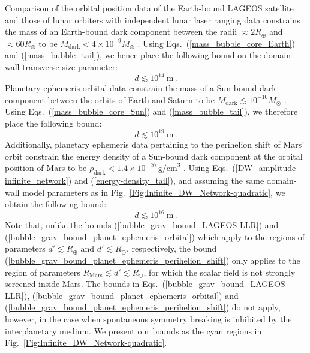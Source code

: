 \documentclass[aps,prd,onecolumn,nofootinbib]{revtex4-2} %
\begin{document}
Comparison of the orbital position data of the Earth-bound LAGEOS satellite and those of lunar orbiters with independent lunar laser ranging data constrains the mass of an Earth-bound dark component between the radii $\approx 2 R_\oplus$ and $\approx 60 R_\oplus$ to be $M_\textrm{dark} < 4 \times 10^{-9} M_\oplus$ \cite{Adler_2008_Grav_LAGEOS-LLR}. 
Using Eqs.~(\ref{mass_bubble_core_Earth}) and (\ref{mass_bubble_tail}), we hence place the following bound on the domain-wall transverse size parameter: 
\begin{equation}
\label{bubble_grav_bound_LAGEOS-LLR}
d \lesssim 10^{14}~\textrm{m}  \, . 
\end{equation}
Planetary ephemeris orbital data constrain the mass of a Sun-bound dark component between the orbits of Earth and Saturn to be $M_\textrm{dark} \lesssim 10^{-10} M_\odot$ \cite{Pitjeva_2013_planetary_ephemeris_MNRAS,Pitjeva_2013_planetary_ephemeris_Astron-Lett}. 
Using Eqs.~(\ref{mass_bubble_core_Sun}) and (\ref{mass_bubble_tail}), we therefore place the following bound: 
\begin{equation}
\label{bubble_grav_bound_planet_ephemeris_orbital}
d \lesssim 10^{19}~\textrm{m}  \, . 
\end{equation}
Additionally, planetary ephemeris data pertaining to the perihelion shift of Mars' orbit constrain the energy density of a Sun-bound dark component at the orbital position of Mars to be $\rho_\textrm{dark} < 1.4 \times 10^{-20}~\textrm{g/cm}^3$ \cite{Pitjeva_2013_planetary_ephemeris_MNRAS,Pitjeva_2013_planetary_ephemeris_Astron-Lett}. 
Using Eqs.~(\ref{DW_amplitude-infinite_network}) and (\ref{energy-density_tail}), and assuming the same domain-wall model parameters as in Fig.~\ref{Fig:Infinite_DW_Network-quadratic}, we obtain the following bound: 
\begin{equation}
\label{bubble_grav_bound_planet_ephemeris_perihelion_shift}
d \lesssim 10^{16}~\textrm{m}  \, . 
\end{equation}
Note that, unlike the bounds (\ref{bubble_grav_bound_LAGEOS-LLR}) and (\ref{bubble_grav_bound_planet_ephemeris_orbital}) which apply to the regions of parameters $d' \lesssim R_\oplus$ and $d' \lesssim R_\odot$, respectively, the bound (\ref{bubble_grav_bound_planet_ephemeris_perihelion_shift}) only applies to the region of parameters $R_\textrm{Mars} \lesssim d' \lesssim R_\odot$, for which the scalar field is not strongly screened inside Mars. 
The bounds in Eqs.~(\ref{bubble_grav_bound_LAGEOS-LLR}), (\ref{bubble_grav_bound_planet_ephemeris_orbital}) and (\ref{bubble_grav_bound_planet_ephemeris_perihelion_shift}) do not apply, however, in the case when spontaneous symmetry breaking is inhibited by the interplanetary medium. 
We present our bounds as the cyan regions in Fig.~\ref{Fig:Infinite_DW_Network-quadratic}. 
\end{document}
